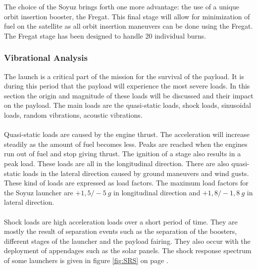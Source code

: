 The choice of the Soyuz brings forth one more advantage: the use of a unique orbit insertion booster, the Fregat. This final stage will allow for minimization of fuel on the satellite as all orbit insertion maneuvers can be done using the Fregat. The Fregat stage has been designed to handle 20 individual burns.

\subsubsection{Vibrational Analysis}
\label{frLVCA}

The launch is a critical part of the mission for the survival of the payload. It is during this period that the payload will experience the most severe loads.
In this section the origin and magnitude of these loads will be discussed and their impact on the payload. The main loads are the quasi-static loads, shock loads, sinusoidal loads, random vibrations, acoustic vibrations.
\\ \\
Quasi-static loads are caused by the engine thrust. The acceleration will increase steadily as the amount of fuel becomes less. Peaks are reached when the engines run out of fuel and stop giving thrust. The ignition of a stage also results in a peak load. These loads are all in the longitudinal direction. There are also quasi-static loads in the lateral direction caused by ground maneuvers and wind gusts. These kind of loads are expressed as load factors. The maximum load factors for the Soyuz launcher are $+1,5/-5\ g$ in longitudinal direction and $+1,8/-1,8\ g$ in lateral direction.
\\ \\
Shock loads are high acceleration loads over a short period of time. They are mostly the result of separation events such as the separation of the boosters, different stages of the launcher and the payload fairing. They also occur with the deployment of appendages such as the solar panels. The shock response spectrum of some launchers is given in figure \ref{fig:SRS} on page \pageref{fig:SRS}.

